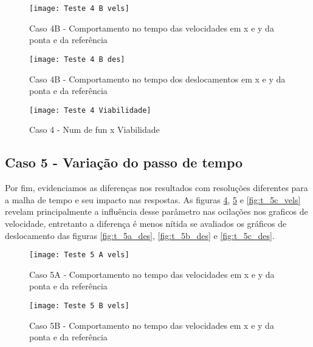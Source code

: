 \begin{figure}[!htb]
    \begin{center}
    \caption{Caso 4B - Comportamento no tempo das velocidades em x e y da ponta e da referência}
    \texttt{[image: Teste 4 B vels]}
    \label{fig:t_4b_vels}
    \end{center}
\end{figure}

\begin{figure}[!htb]
    \begin{center}
    \caption{Caso 4B - Comportamento no tempo dos deslocamentos em x e y da ponta e da referência}
    \texttt{[image: Teste 4 B des]}
    \label{fig:t_4b_des}
    \end{center}
\end{figure}

\begin{figure}[!htb]
    \begin{center}
    \caption{Caso 4 - Num de fun x Viabilidade}
    \texttt{[image: Teste 4 Viabilidade]}
    \label{fig:t_4_viab}
    \end{center}
\end{figure}

\subsection{Caso 5 - Variação do passo de tempo}
Por fim, evidenciamos as diferenças nos resultados com resoluções diferentes para a malha de tempo e seu impacto nas respostas.
As figuras \ref{fig:t_5a_vels}, \ref{fig:t_5b_vels} e \ref{fig:t_5c_vels} revelam principalmente a influência desse parâmetro
nas ocilações nos graficos de velocidade, entretanto a diferença é menos nítida se avaliados os gráficos de deslocamento das figuras
\ref{fig:t_5a_des}, \ref{fig:t_5b_des} e \ref{fig:t_5c_des}.

\begin{figure}[!htb]
    \begin{center}
    \caption{Caso 5A - Comportamento no tempo das velocidades em x e y da ponta e da referência}
    \texttt{[image: Teste 5 A vels]}
    \label{fig:t_5a_vels}
    \end{center}
\end{figure}

\begin{figure}[!htb]
    \begin{center}
    \caption{Caso 5B - Comportamento no tempo das velocidades em x e y da ponta e da referência}
    \texttt{[image: Teste 5 B vels]}
    \label{fig:t_5b_vels}
    \end{center}
\end{figure}

